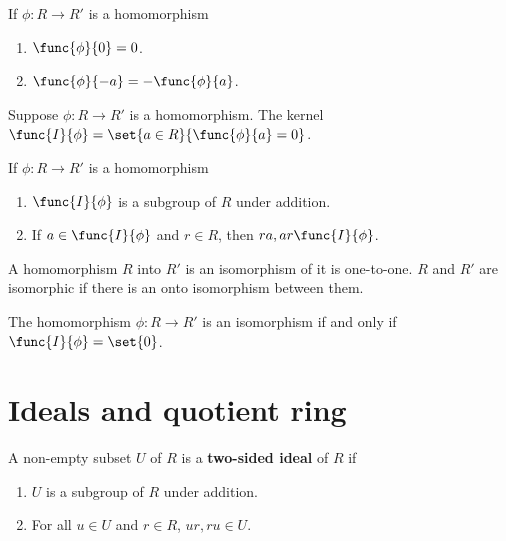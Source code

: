 \begin{lemma}
   If \(\phi : R \to R'\) is a homomorphism
   \begin{enumerate}
    \item \(\func{\phi}{0} = 0\).
    \item \(\func{\phi}{-a}= - \func{\phi}{a}\).
   \end{enumerate}
\end{lemma}

\begin{definition}
    Suppose \(\phi:R \to R'\) is a homomorphism. The kernel \(\func{I}{\phi} = \set{ a \in R}{\func{\phi}{a} = 0}\).
\end{definition}

\begin{lemma}
    If \(\phi: R \to R'\) is a homomorphism
    \begin{enumerate}
        \item \(\func{I}{\phi}\) is a subgroup of \(R\) under addition.
        \item If \(a \in \func{I}{\phi}\) and \(r \in R\), then \(ra, ar \func{I}{\phi}\).
    \end{enumerate}
\end{lemma}

\begin{definition}
    A homomorphism \(R\) into \(R'\) is an isomorphism of it is one-to-one. \(R\) and \(R'\) are isomorphic if there is an onto isomorphism between them.
\end{definition}

\begin{lemma}
    The homomorphism \(\phi: R \to R'\) is an isomorphism if and only if \(\func{I}{\phi} = \set{0}\).
\end{lemma}

\section{Ideals and quotient ring}
\begin{definition}
    A non-empty subset \(U\) of \(R\) is a \textbf{two-sided ideal} of \(R\) if 
    \begin{enumerate}
        \item \(U\) is a subgroup of \(R\) under addition.
        \item For all \(u \in U\) and \(r \in R\), \(ur , ru \in U\).
    \end{enumerate}
\end{definition}

